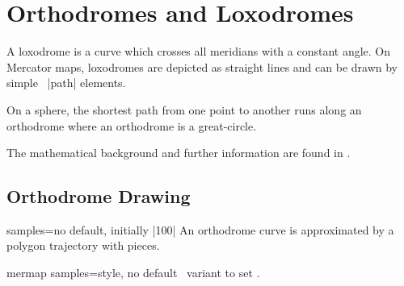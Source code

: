 \clearpage
\section{Orthodromes and Loxodromes}\label{sec:orthodromes}%

A loxodrome is a curve which crosses all meridians with
a constant angle. On Mercator maps, loxodromes are depicted as straight lines
and can be drawn by simple \tikzname\ |path| elements.

On a sphere, the shortest path
from one point to another runs along an orthodrome where
an orthodrome is a great-circle.

The mathematical background and further information are found in \cite{Sturm:2020}.


\subsection{Orthodrome Drawing}

\begin{docMrcKey}{samples}{=}{no default, initially |100|}
  An orthodrome curve is approximated by a polygon trajectory with
   pieces.
\end{docMrcKey}


\begin{docTikzKey}{mermap samples}{=}{style, no default}
  \tikzname\ variant to set .
\end{docTikzKey}


